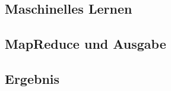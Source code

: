 \subsection{Maschinelles Lernen}\label{code:verbund_2}
\begin{figure}[ht]
  \centering
\end{figure}

\newpage
\subsection{MapReduce und Ausgabe}\label{code:verbund_3}
\begin{figure}[h]
  \centering
\end{figure}

\subsection{Ergebnis}\label{code:verbund_4}
\begin{figure}[h]
  \centering
\end{figure}